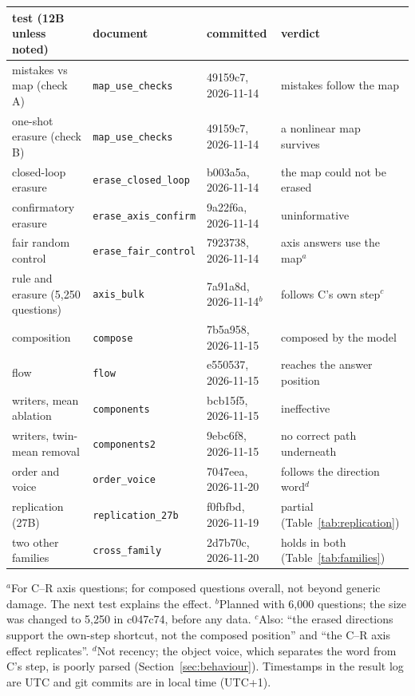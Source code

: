 \documentclass[11pt]{article}
\begin{document}
\begin{center}
\footnotesize
\begin{tabular}{@{}llll@{}}
  \toprule
  test (12B unless noted) & document & committed & verdict \\
  \midrule
  mistakes vs map (check A) & \texttt{map\_use\_checks} & 49159c7, 2026-11-14 & mistakes follow the map \\
  one-shot erasure (check B) & \texttt{map\_use\_checks} & 49159c7, 2026-11-14 & a nonlinear map survives \\
  closed-loop erasure & \texttt{erase\_closed\_loop} & b003a5a, 2026-11-14 & the map could not be erased \\
  confirmatory erasure & \texttt{erase\_axis\_confirm} & 9a22f6a, 2026-11-14 & uninformative \\
  fair random control & \texttt{erase\_fair\_control} & 7923738, 2026-11-14 & axis answers use the map$^{a}$ \\
  rule and erasure (5,250 questions) & \texttt{axis\_bulk} & 7a91a8d, 2026-11-14$^{b}$ & follows C's own step$^{c}$ \\
  composition & \texttt{compose} & 7b5a958, 2026-11-15 & composed by the model \\
  flow & \texttt{flow} & e550537, 2026-11-15 & reaches the answer position \\
  writers, mean ablation & \texttt{components} & bcb15f5, 2026-11-15 & ineffective \\
  writers, twin-mean removal & \texttt{components2} & 9ebc6f8, 2026-11-15 & no correct path underneath \\
  order and voice & \texttt{order\_voice} & 7047eea, 2026-11-20 & follows the direction word$^{d}$ \\
  replication (27B) & \texttt{replication\_27b} & f0fbfbd, 2026-11-19 & partial (Table~\ref{tab:replication}) \\
  two other families & \texttt{cross\_family} & 2d7b70c, 2026-11-20 & holds in both (Table~\ref{tab:families}) \\
  \bottomrule
\end{tabular}

\raggedright
$^{a}$For C--R axis questions; for composed questions overall, not beyond generic damage. The next test explains the
effect. $^{b}$Planned with 6,000 questions; the size was changed to 5,250 in c047c74, before any data. $^{c}$Also:
``the erased directions support the own-step shortcut, not the composed position'' and ``the C--R axis effect
replicates''. $^{d}$Not recency; the object voice, which separates the word from C's step, is poorly parsed (Section~\ref{sec:behaviour}). Timestamps in the result log are UTC and git commits are in local time (UTC+1).
\end{center}
\end{document}
